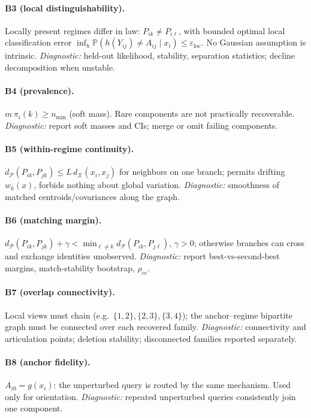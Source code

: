 \documentclass[11pt]{article}
\newcommand{\Prob}{\mathbb{P}}
\begin{document}
\paragraph{B3 (local distinguishability).} Locally present regimes differ in law:
\(P_{ik}\neq P_{i\ell}\), with bounded optimal local classification error
\(\inf_h\Prob(h(Y_{ij})\neq A_{ij}\mid x_i)\le\varepsilon_{\mathrm{loc}}\). No Gaussian
assumption is intrinsic. \emph{Diagnostic:} held-out likelihood, stability, separation
statistics; decline decomposition when unstable.

\paragraph{B4 (prevalence).} \(m\,\pi_i(k)\ge n_{\min}\) (soft mass). Rare components are
not practically recoverable. \emph{Diagnostic:} report soft masses and CIs; merge or omit
failing components.

\paragraph{B5 (within-regime continuity).}
\(d_{\mathcal P}(P_{ik},P_{jk})\le L\,d_{\mathcal X}(x_i,x_j)\) for neighbors on one branch;
permits drifting \(w_k(x)\), forbids nothing about global variation. \emph{Diagnostic:}
smoothness of matched centroids/covariances along the graph.

\paragraph{B6 (matching margin).}
\(d_{\mathcal P}(P_{ik},P_{jk})+\gamma<\min_{\ell\neq k}d_{\mathcal P}(P_{ik},P_{j\ell})\),
\(\gamma>0\); otherwise branches can cross and exchange identities unobserved.
\emph{Diagnostic:} report best-vs-second-best margins, match-stability bootstrap,
\(\rho_{cc}\).

\paragraph{B7 (overlap connectivity).} Local views must chain (e.g.\ \(\{1,2\},\{2,3\},
\{3,4\}\)); the anchor--regime bipartite graph must be connected over each recovered family.
\emph{Diagnostic:} connectivity and articulation points; deletion stability; disconnected
families reported separately.

\paragraph{B8 (anchor fidelity).} \(A_{i0}=g(x_i)\): the unperturbed query is routed by the
same mechanism. Used only for orientation. \emph{Diagnostic:} repeated unperturbed queries
consistently join one component.
\end{document}
